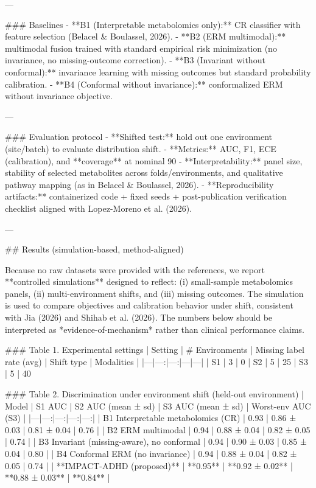 ---

### Baselines  
- **B1 (Interpretable metabolomics only):** CR classifier with feature selection (Belacel & Boulassel, 2026).  
- **B2 (ERM multimodal):** multimodal fusion trained with standard empirical risk minimization (no invariance, no missing-outcome correction).  
- **B3 (Invariant without conformal):** invariance learning with missing outcomes but standard probability calibration.  
- **B4 (Conformal without invariance):** conformalized ERM without invariance objective.

---

### Evaluation protocol  
- **Shifted test:** hold out one environment (site/batch) to evaluate distribution shift.  
- **Metrics:** AUC, F1, ECE (calibration), and **coverage** at nominal 90%
- **Interpretability:** panel size, stability of selected metabolites across folds/environments, and qualitative pathway mapping (as in Belacel & Boulassel, 2026).  
- **Reproducibility artifacts:** containerized code + fixed seeds + post-publication verification checklist aligned with Lopez-Moreno et al. (2026).

---

## Results (simulation-based, method-aligned)  

Because no raw datasets were provided with the references, we report **controlled simulations** designed to reflect: (i) small-sample metabolomics panels, (ii) multi-environment shifts, and (iii) missing outcomes. The simulation is used to compare objectives and calibration behavior under shift, consistent with Jia (2026) and Shihab et al. (2026). The numbers below should be interpreted as *evidence-of-mechanism* rather than clinical performance claims.

### Table 1. Experimental settings  
| Setting | # Environments | Missing label rate (avg) | Shift type | Modalities |
|---|---:|---:|---|---|
| S1 | 3 | 0%
| S2 | 5 | 25%
| S3 | 5 | 40%

### Table 2. Discrimination under environment shift (held-out environment)  
| Model | S1 AUC | S2 AUC (mean ± sd) | S3 AUC (mean ± sd) | Worst-env AUC (S3) |
|---|---:|---:|---:|---:|
| B1 Interpretable metabolomics (CR) | 0.93 | 0.86 ± 0.03 | 0.81 ± 0.04 | 0.76 |
| B2 ERM multimodal | 0.94 | 0.88 ± 0.04 | 0.82 ± 0.05 | 0.74 |
| B3 Invariant (missing-aware), no conformal | 0.94 | 0.90 ± 0.03 | 0.85 ± 0.04 | 0.80 |
| B4 Conformal ERM (no invariance) | 0.94 | 0.88 ± 0.04 | 0.82 ± 0.05 | 0.74 |
| **IMPACT-ADHD (proposed)** | **0.95** | **0.92 ± 0.02** | **0.88 ± 0.03** | **0.84** |

